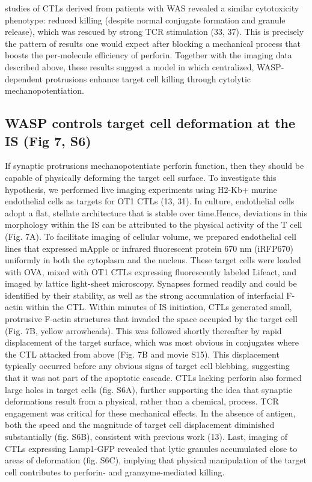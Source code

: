 studies of CTLs derived from patients with WAS revealed a similar cytotoxicity phenotype: reduced killing (despite normal conjugate formation and granule release), which was rescued by strong TCR stimulation (33, 37). This is precisely the pattern of results one would expect after blocking a mechanical process that boosts the per-molecule efficiency of perforin. Together with the imaging data described above, these results suggest a model in which centralized, WASP-dependent protrusions enhance target cell killing through cytolytic mechanopotentiation.

\subsection{WASP controls target cell deformation at the IS (Fig 7, S6)}
If synaptic protrusions mechanopotentiate perforin function, then they should be capable of physically deforming the target cell surface. To investigate this hypothesis, we performed live imaging experiments using H2-Kb+ murine endothelial cells as targets for OT1 CTLs (13, 31). In culture, endothelial cells adopt a flat, stellate architecture that is stable over time.Hence, deviations in this morphology within the IS can be attributed to the physical activity of the T cell (Fig. 7A). To facilitate imaging of cellular volume, we prepared endothelial cell lines that expressed mApple or infrared fluorescent protein 670 nm (iRFP670) uniformly in both the cytoplasm and the nucleus. These target cells were loaded with OVA, mixed with OT1 CTLs expressing fluorescently labeled Lifeact, and imaged by lattice light-sheet microscopy. Synapses formed readily and could be identified by their stability, as well as the strong accumulation of interfacial F-actin within the CTL. Within minutes of IS initiation, CTLs generated small, protrusive F-actin structures that invaded the space occupied by the target cell (Fig. 7B, yellow arrowheads). This was followed shortly thereafter by rapid displacement of the target surface, which was most obvious in conjugates where the CTL attacked from above (Fig. 7B and movie S15). This displacement typically occurred before any obvious signs of target cell blebbing, suggesting that it was not part of the apoptotic cascade. CTLs lacking perforin also formed large holes in target cells (fig. S6A), further supporting the idea that synaptic deformations result from a physical, rather than a chemical, process. TCR engagement was critical for these mechanical effects. In the absence of antigen, both the speed and the magnitude of target cell displacement diminished substantially (fig. S6B), consistent with previous work (13). Last, imaging of CTLs expressing Lamp1-GFP revealed that lytic granules accumulated close to areas of deformation (fig. S6C), implying that physical manipulation of the target cell contributes to perforin- and granzyme-mediated killing.

